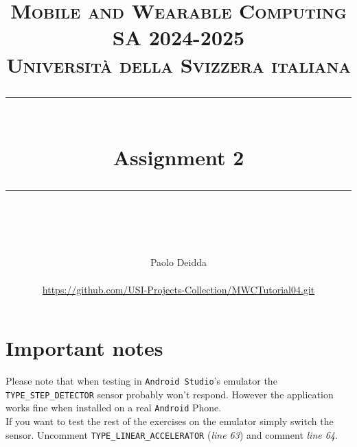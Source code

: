 \documentclass{article}
\title{
	\normalfont\normalsize
	\textsc{Mobile and Wearable Computing SA 2024-2025\\%
	Universit\`a della Svizzera italiana}\\
	\vspace{25pt}
	\rule{\linewidth}{0.5pt}\\
	\vspace{20pt}
	{\huge Assignment 2}\\
	\vspace{12pt}
	\rule{\linewidth}{1pt}\\
	\vspace{12pt}
}
\author{
  Paolo Deidda \\
  \text{paolo.deidda@usi.ch} \\ 
  \url{https://github.com/USI-Projects-Collection/MWCTutorial04.git}
}
\newcommand{\codepath}{../app/src/main/java/com/example/stepappv4}
\begin{document}
\maketitle

\tableofcontents

\vspace{2cm}

\section*{Important notes}
Please note that when testing in \texttt{Android Studio}'s emulator the \texttt{TYPE\_STEP\_DETECTOR} sensor probably won't respond. However the application works fine when installed on a real \texttt{Android} Phone. \\

If you want to test the rest of the exercises on the emulator simply switch the sensor. Uncomment \texttt{TYPE\_LINEAR\_ACCELERATOR} (\textit{line 63}) and comment \textit{line 64}.



\newpage


\newpage


\newpage

\end{document}
